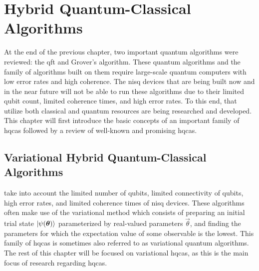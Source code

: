 \chapter[Hybrid Quantum-Classical Algorithms]{Hybrid Quantum-Classical\\Algorithms} \label{chap:hybrid-quantum-classical-algorithms}
At the end of the previous chapter, two important quantum algorithms were reviewed: the \gls{qft} and Grover's algorithm.
These quantum algorithms and the family of algorithms built on them require large-scale quantum computers with low error rates and high coherence.
The \gls{nisq} devices that are being built now and in the near future will not be able to run these algorithms due to their limited qubit count, limited coherence times, and high error rates.
To this end,  that utilize both classical and quantum resources are being researched and developed.
This chapter will first introduce the basic concepts of an important family of \glspl{hqca} followed by a review of well-known and promising \glspl{hqca}.

\section{Variational Hybrid Quantum-Classical Algorithms}
 take into account the limited number of qubits, limited connectivity of qubits, high error rates, and limited coherence times of \gls{nisq} devices.
These algorithms often make use of the variational method which consists of preparing an initial trial state $\vert{\psi(\bm{\theta})}\rangle$ parameterized by real-valued parameters $\vec{\theta}$, and finding the parameters for which the expectation value of some observable is the lowest.
This family of \glspl{hqca} is sometimes also referred to as variational quantum algorithms.
The rest of this chapter will be focused on variational \glspl{hqca}, as this is the main focus of research regarding \glspl{hqca}.

